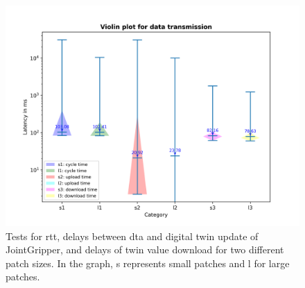 \begin{figure}[htb]
    \includegraphics[width=\textwidth]{figures/tests/DT/violin_patch_size.png}
    \centering
    \caption{Tests for \gls{rtt}, delays between \gls{dta} and digital twin 
    update of JointGripper, and delays of twin value download for 
    two different patch sizes. In the graph, s represents small patches 
    and l for large patches.\label{fig: UD-violin-patchsize}}
\end{figure}

